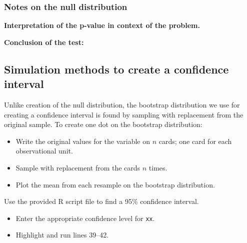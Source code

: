 \documentclass[
]{report}
\newenvironment{Shaded}{\begin{snugshade}}{\end{snugshade}}
\newcommand{\AttributeTok}[1]{\textcolor[rgb]{0.13,0.29,0.53}{#1}}
\newcommand{\CommentTok}[1]{\textcolor[rgb]{0.56,0.35,0.01}{\textit{#1}}}
\newcommand{\DecValTok}[1]{\textcolor[rgb]{0.00,0.00,0.81}{#1}}
\newcommand{\FloatTok}[1]{\textcolor[rgb]{0.00,0.00,0.81}{#1}}
\newcommand{\FunctionTok}[1]{\textcolor[rgb]{0.13,0.29,0.53}{\textbf{#1}}}
\newcommand{\NormalTok}[1]{#1}
\newcommand{\SpecialCharTok}[1]{\textcolor[rgb]{0.81,0.36,0.00}{\textbf{#1}}}
\newcommand{\StringTok}[1]{\textcolor[rgb]{0.31,0.60,0.02}{#1}}
\begin{document}
\subsubsection*{Notes on the null distribution}\label{notes-on-the-null-distribution-1}

\vspace{2in}

\textbf{Interpretation of the p-value in context of the problem.}

\vspace{1in}

\textbf{Conclusion of the test:}

\vspace{1in}

\subsection*{Simulation methods to create a confidence interval}\label{simulation-methods-to-create-a-confidence-interval}

Unlike creation of the null distribution, the bootstrap distribution we use for creating a confidence interval is found by sampling with replacement from the original sample. To create one dot on the bootstrap distribution:

\begin{itemize}
\item
  Write the original values for the variable on \(n\) cards; one card for each observational unit.
\item
  Sample with replacement from the cards \(n\) times.
\item
  Plot the mean from each resample on the bootstrap distribution.
\end{itemize}

Use the provided R script file to find a 95\% confidence interval.

\begin{itemize}
\item
  Enter the appropriate confidence level for \texttt{xx}.
\item
  Highlight and run lines 39--42.
\end{itemize}

\begin{Shaded}
\end{Shaded}
\end{document}
